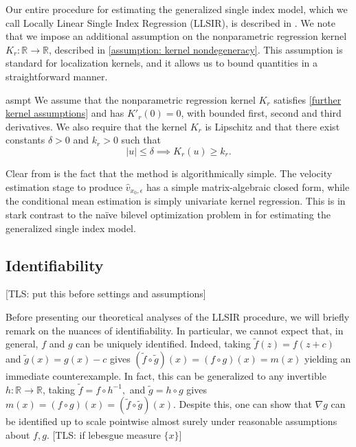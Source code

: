 \documentclass[11pt]{article}
\newcommand{\tls}[1]{{\color{cyan}[TLS: #1]}}
\begin{document}
Our entire procedure for estimating the generalized single index model, which we call Locally Linear Single Index Regression (LLSIR), is described in . We note that we impose an additional assumption on the nonparametric regression kernel $K_r:\mathbb{R} \rightarrow \mathbb{R}$, described in \cref{assumption: kernel nondegeneracy}. This assumption is standard for localization kernels, and it allows us to bound quantities in a straightforward manner.

\begin{restatable}{asmpt}{} \label{assumption: kernel nondegeneracy}
    We assume that the nonparametric regression kernel $K_r$ satisfies \cref{further kernel assumptions} and has $K'_r(0) = 0$, with bounded first, second and third derivatives. We also require that the kernel $K_r$ is Lipschitz and that there exist constants $\delta > 0$ and $k_r > 0$ such that 
    \[|u| \leq \delta \implies K_r(u) \geq k_r.\]
\end{restatable}


Clear from  is the fact that the method is algorithmically simple. The velocity estimation stage to produce $\hat v_{x_0, \epsilon}$ has a simple matrix-algebraic closed form, while the conditional mean estimation is simply univariate kernel regression. This is in stark contrast to the na\"ive bilevel optimization problem in  for estimating the generalized single index model.

\subsection{Identifiability} \tls{put this before settings and assumptions}

Before presenting our theoretical analyses of the LLSIR procedure, we will briefly remark on the nuances of identifiability. In particular, we cannot expect that, in general, $f$ and $g$ can be uniquely identified. Indeed, taking $\tilde f(z) = f(z + c)$ and $\tilde g(x) = g(x) - c$ gives $(\tilde f \circ \tilde g)(x) = (f \circ g)(x) = m(x)$ yielding an immediate counterexample. In fact, this can be generalized to any invertible $h: \mathbb{R}\to \mathbb{R}$, taking $\tilde f = f \circ h^{-1},$ and $\tilde g = h \circ g$ gives $m(x) = (f\circ g)(x) = (\tilde f \circ \tilde g)(x)$. Despite this, one can show that $\nabla g$ can be identified up to scale pointwise almost surely under reasonable assumptions about $f, g$. \tls{ if lebesgue measure  $\{x \}$}
\end{document}
